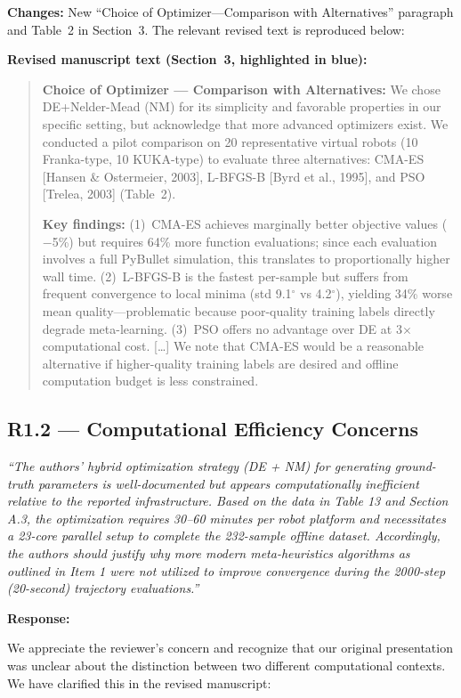 \documentclass[11pt,a4paper]{article}
\newcommand{\reviewercomment}[1]{\medskip\noindent\textit{``#1''}\medskip}
\newcommand{\response}{\noindent\textbf{Response:}\par\noindent}
\begin{document}
\textbf{Changes:} New ``Choice of Optimizer---Comparison with Alternatives'' paragraph and Table~2 in Section~3. The relevant revised text is reproduced below:

\textbf{Revised manuscript text (Section~3, highlighted in blue):}

\begin{quote}\color{blue}\small
\textbf{Choice of Optimizer --- Comparison with Alternatives:} We chose DE+Nelder-Mead (NM) for its simplicity and favorable properties in our specific setting, but acknowledge that more advanced optimizers exist. We conducted a pilot comparison on 20 representative virtual robots (10 Franka-type, 10 KUKA-type) to evaluate three alternatives: CMA-ES [Hansen \& Ostermeier, 2003], L-BFGS-B [Byrd et al., 1995], and PSO [Trelea, 2003] (Table~2).

\textbf{Key findings:} (1)~CMA-ES achieves marginally better objective values ($-$5\%) but requires 64\% more function evaluations; since each evaluation involves a full PyBullet simulation, this translates to proportionally higher wall time. (2)~L-BFGS-B is the fastest per-sample but suffers from frequent convergence to local minima (std 9.1$^\circ$ vs 4.2$^\circ$), yielding 34\% worse mean quality---problematic because poor-quality training labels directly degrade meta-learning. (3)~PSO offers no advantage over DE at 3$\times$ computational cost. [\ldots] We note that CMA-ES would be a reasonable alternative if higher-quality training labels are desired and offline computation budget is less constrained.
\end{quote}

\subsection*{R1.2 --- Computational Efficiency Concerns}

\reviewercomment{The authors' hybrid optimization strategy (DE + NM) for generating ground-truth parameters is well-documented but appears computationally inefficient relative to the reported infrastructure. Based on the data in Table 13 and Section A.3, the optimization requires 30--60 minutes per robot platform and necessitates a 23-core parallel setup to complete the 232-sample offline dataset. Accordingly, the authors should justify why more modern meta-heuristics algorithms as outlined in Item 1 were not utilized to improve convergence during the 2000-step (20-second) trajectory evaluations.}

\response
We appreciate the reviewer's concern and recognize that our original presentation was unclear about the distinction between two different computational contexts. We have clarified this in the revised manuscript:
\end{document}
